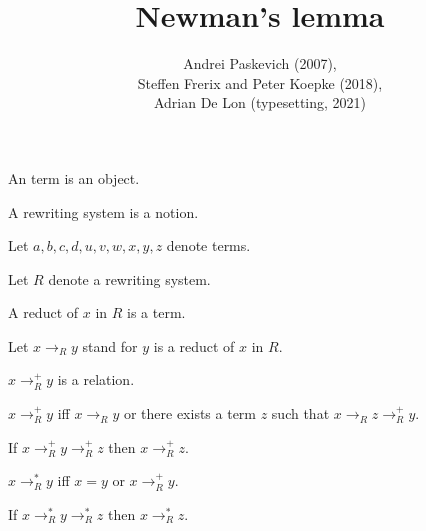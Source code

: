 \documentclass{article}
\title{Newman's lemma}
\author{Andrei Paskevich (2007), \\
Steffen Frerix and Peter Koepke (2018), \\
Adrian De Lon (typesetting, 2021)}
\date{}
\newcommand{\reduces}[1]{\to_{#1}}
\newcommand{\reducesTC}[1]{\to_{#1}^{+}}
\newcommand{\reducesTCR}[1]{\to_{#1}^{*}}
\begin{document}

  \maketitle
  
  \begin{forthel}
  \end{forthel}

  \begin{forthel}

    \begin{signature}
      An term is an object.
    \end{signature}

    \begin{signature}
      A rewriting system is a notion.
    \end{signature}

    Let $a,b,c,d,u,v,w,x,y,z$ denote terms.

    Let $R$ denote a rewriting system.

    \begin{signature}[Reduct]
      A reduct of $x$ in $R$ is a term.
    \end{signature}

    Let $x \reduces{R} y$ stand for $y$ is a reduct of $x$ in $R$.

    \begin{signature}
      $x \reducesTC{R} y$ is a relation.
    \end{signature}

    \begin{axiom}
      $x \reducesTC{R} y$ iff $x \reduces{R} y$
      or there exists a term $z$ such that
      $x \reduces{R} z \reducesTC{R} y$.
    \end{axiom}

    \begin{axiom}
      If $x \reducesTC{R} y \reducesTC{R} z$ then $x \reducesTC{R} z$.
    \end{axiom}

    \begin{definition}
      $x \reducesTCR{R} y$ iff $x = y$ or $x \reducesTC{R} y$.
    \end{definition}

    \begin{lemma}
      If $x \reducesTCR{R} y \reducesTCR{R} z$ then $x \reducesTCR{R} z$.
    \end{lemma}


\end{forthel}
\end{document}
